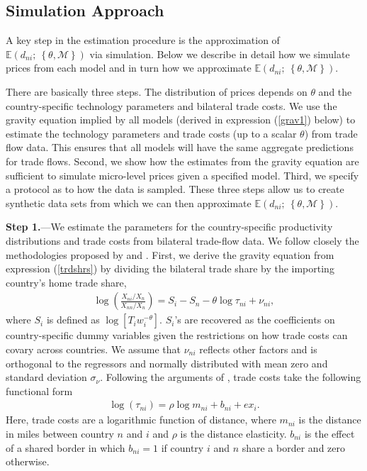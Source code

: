 \documentclass[12pt,dvips, ps2pdf]{article}
\begin{document}
\subsection{Simulation Approach}\label{simmulation}

A key step in the estimation procedure is the approximation of $\mathbb{E}(d_{ni}; \ \left\{\theta,{\mathcal{M}}\right\})$ via simulation. Below we describe in detail how we simulate prices from each model and in turn how we approximate $\mathbb{E}(d_{ni}; \ \left\{\theta,{\mathcal{M}}\right\})$.

There are basically three steps. The distribution of prices depends on $\theta$ and the country-specific technology parameters and bilateral trade costs. We use the gravity equation implied by all models (derived in expression (\ref{grav1}) below) to estimate the technology parameters and trade costs (up to a scalar $\theta$) from trade flow data. This ensures that all models will have the same aggregate predictions for trade flows. Second, we show how the estimates from the gravity equation are sufficient to simulate micro-level prices given a specified model. Third, we specify a protocol as to how the data is sampled. These three steps allow us to create synthetic data sets from which we can then approximate $\mathbb{E}(d_{ni}; \ \left\{\theta,{\mathcal{M}}\right\})$.


\textbf{Step 1.}---We estimate the parameters for the country-specific productivity distributions and trade costs from bilateral trade-flow data. We follow closely the methodologies proposed by \citet{ek02} and \citet{waugh}. First, we derive the gravity equation from expression (\ref{trdshrs}) by dividing the bilateral trade share by the importing country's home trade share,
\begin{eqnarray}
\log\left(\frac{X_{ni}/X_n}{X_{nn}/X_{n}}\right) = S_i - S_n -
\theta \log \tau_{ni} + \nu_{ni},\label{grav1}
\end{eqnarray}
\noindent where $S_i$ is defined as $\log\left[T_i w_i^{-\theta} \right]$. $S_i$'s are recovered as the coefficients on country-specific dummy variables given the restrictions on how trade costs can covary across countries. We assume that $\nu_{ni}$ reflects other factors and is orthogonal to the regressors and normally distributed with mean zero and standard deviation $\sigma_{\nu}$. Following the arguments of \citet{waugh}, trade costs take the following functional form
\begin{eqnarray}
\log(\tau_{ni}) = \rho \log m_{ni} + b_{ni} + ex_i.
\label{grav2}
\end{eqnarray}
\noindent Here, trade costs are a logarithmic function of distance, where $m_{ni}$ is the distance in miles between country $n$ and $i$ and $\rho$ is the distance elasticity. $b_{ni}$ is the effect of a shared border in which $b_{ni}=1$ if country $i$ and $n$ share a border and zero otherwise.
\end{document}
